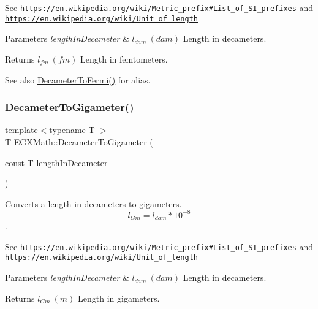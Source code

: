 See \href{https://en.wikipedia.org/wiki/Metric_prefix#List_of_SI_prefixes}{\tt https\+://en.\+wikipedia.\+org/wiki/\+Metric\+\_\+prefix\#\+List\+\_\+of\+\_\+\+S\+I\+\_\+prefixes} and \href{https://en.wikipedia.org/wiki/Unit_of_length}{\tt https\+://en.\+wikipedia.\+org/wiki/\+Unit\+\_\+of\+\_\+length} 
\begin{DoxyParams}{Parameters}
{\em length\+In\+Decameter} & $ l_{dam}\ (dam)$ Length in decameters. \\
\hline
\end{DoxyParams}
\begin{DoxyReturn}{Returns}
$ l_{fm}\ (fm)$ Length in femtometers. 
\end{DoxyReturn}
\begin{DoxySeeAlso}{See also}
\mbox{\hyperlink{group___e_g_x_math-_conversions-_length_conversions-_s_i-_decameter-_non-_s_i_gadc348f062b782f64f13784377f032f9b}{Decameter\+To\+Fermi()}} for alias. 
\end{DoxySeeAlso}
\mbox{\label{group___e_g_x_math-_conversions-_length_conversions-_s_i-_decameter-_s_i_gaa889b61d8f9874010be977ce71b4dfaf}} 
\subsubsection{\texorpdfstring{Decameter\+To\+Gigameter()}{DecameterToGigameter()}}
{\footnotesize\ttfamily template$<$typename T $>$ \\
T E\+G\+X\+Math\+::\+Decameter\+To\+Gigameter (\begin{DoxyParamCaption}\item[{const T}]{length\+In\+Decameter }\end{DoxyParamCaption})}



Converts a length in decameters to gigameters. \[ l_{Gm}=l_{dam} * 10^{-8} \]. 

See \href{https://en.wikipedia.org/wiki/Metric_prefix#List_of_SI_prefixes}{\tt https\+://en.\+wikipedia.\+org/wiki/\+Metric\+\_\+prefix\#\+List\+\_\+of\+\_\+\+S\+I\+\_\+prefixes} and \href{https://en.wikipedia.org/wiki/Unit_of_length}{\tt https\+://en.\+wikipedia.\+org/wiki/\+Unit\+\_\+of\+\_\+length} 
\begin{DoxyParams}{Parameters}
{\em length\+In\+Decameter} & $ l_{dam}\ (dam)$ Length in decameters. \\
\hline
\end{DoxyParams}
\begin{DoxyReturn}{Returns}
$ l_{Gm}\ (m)$ Length in gigameters. 
\end{DoxyReturn}
\mbox{\label{group___e_g_x_math-_conversions-_length_conversions-_s_i-_decameter-_s_i_ga24daff76ac2de77bf8f55d134aa450d8}} 
